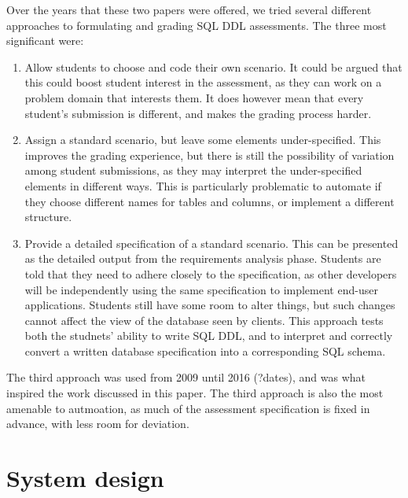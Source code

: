 \documentclass[sigconf, authordraft, capitalise]{acmart}
\begin{document}
Over the years that these two papers were offered, we tried several different approaches to formulating and grading SQL DDL assessments. The three most significant were:
\begin{enumerate}
    \item Allow students to choose and code their own scenario. It could be argued that this could boost student interest in the assessment, as they can work on a problem domain that interests them. It does however mean that every student's submission is different, and makes the grading process harder.
    
    \item Assign a standard scenario, but leave some elements under-specified. This improves the grading experience, but there is still the possibility of variation among student submissions, as they may interpret the under-specified elements in different ways. This is particularly problematic to automate if they choose different names for tables and columns, or implement a different structure.
    
    \item Provide a detailed specification of a standard scenario. This can be presented as the detailed output from the requirements analysis phase. Students are told that they need to adhere closely to the specification, as other developers will be independently using the same specification to implement end-user applications. Students still have some room to alter things, but such changes cannot affect the view of the database seen by clients. This approach tests both the studnets' ability to write SQL DDL, and to interpret and correctly convert a written database specification into a corresponding SQL schema.
\end{enumerate}

The third approach was used from 2009 until 2016 (?dates), and was what inspired the work discussed in this paper. The third approach is also the most amenable to autmoation, as much of the assessment specification is fixed in advance, with less room for deviation.



\section{System design}
\label{sec-design}
\end{document}
